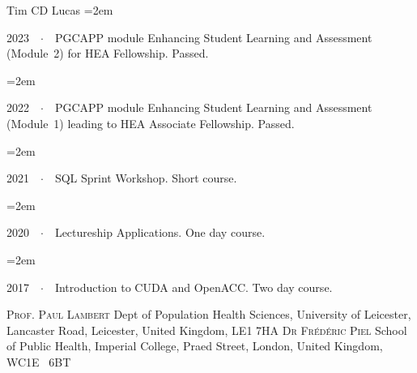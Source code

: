 \documentclass{scrartcl}
\newcommand{\Description}[1]{\hangindent=2em\hangafter=0\noindent\raggedright\footnotesize{#1}\par\normalsize\vspace{1em}} %
\begin{document}
\begin{cv}{Tim {\Large CD} Lucas}
\Description{2023\ \ $\cdotp$\ \ {\scriptsize PGCAPP} module Enhancing Student Learning and Assessment (Module~2) for HEA Fellowship. Passed.}
\vspace{-0.5em} %
\Description{2022\ \ $\cdotp$\ \ {\scriptsize PGCAPP} module Enhancing Student Learning and Assessment (Module~1) leading to HEA Associate Fellowship. Passed.}
\vspace{-0.5em} %
\Description{2021\ \ $\cdotp$\ \ {\scriptsize SQL} Sprint Workshop. Short course.}
\vspace{-0.5em} %
\Description{2020\ \ $\cdotp$\ \ Lectureship Applications. One day course.}
\vspace{-0.5em} %
\Description{2017\ \ $\cdotp$\ \ Introduction to CUDA and OpenACC. Two day course.}
\vspace{-0.5em} %

\vspace{1em} %

{\color{Maroon}}\vspace{-1em}

\begin{multicols}{2}
\begin{footnotesize}
\textsc{Prof. Paul Lambert}\newline
Dept of Population Health Sciences,
\newline
University of Leicester,\newline
Lancaster Road,\newline
Leicester,\newline
United Kingdom,\newline
{\scriptsize LE}1 7{\scriptsize HA}
\vfill
\columnbreak
\textsc{Dr Fr\'{e}d\'{e}ric Piel}\newline
School of Public Health,\newline
Imperial College,\newline
Praed Street,\newline
London,\newline
United Kingdom,\newline
{\scriptsize WC}1{\scriptsize E} \ 6{\scriptsize BT}




\end{footnotesize}
\end{multicols}
\end{cv}
\end{document}
